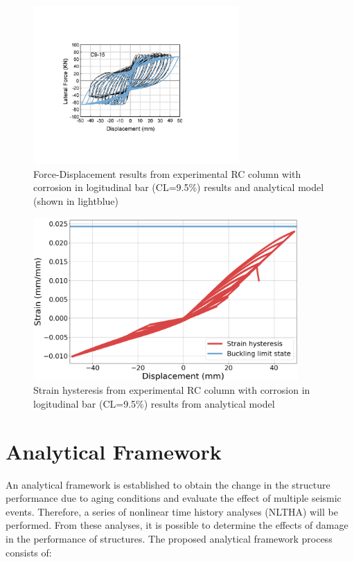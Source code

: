 \begin{figure}[htbp]
	\centering
	\includegraphics[width=0.7\textwidth]{Chapter-4/figs/Model_Calibration_Ma2012}
	\caption{Force-Displacement results from experimental RC column with corrosion in logitudinal bar (CL=9.5\%) results \cite{Ma2012} and analytical model (shown in lightblue)}
	\label{fig:ModelCalibration_Corrosion}
\end{figure}
\begin{figure}[htbp]
	\centering
	\includegraphics[width=0.9\textwidth]{Chapter-4/figs/MaEtAl_StrainHisteresis}
	\caption{Strain hysteresis from experimental RC column with corrosion in logitudinal bar (CL=9.5\%) results from analytical model}
	\label{fig:ModelCalibration_Corrosion_Hysteresis}
\end{figure}
\newpage

\section{Analytical Framework}

An analytical framework is established to obtain the change in the structure performance due to aging conditions and evaluate the effect of multiple seismic events. Therefore, a series of nonlinear time history analyses (NLTHA) will be performed. From these analyses, it is possible to determine the effects of damage in the performance of structures. The proposed analytical framework process consists of:

